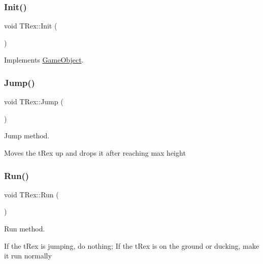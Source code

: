 \mbox{\label{class_t_rex_a9975357a104130b3b8f6c5ed65f2eb0e}} 
\subsubsection{\texorpdfstring{Init()}{Init()}}
{\footnotesize\ttfamily void T\+Rex\+::\+Init (\begin{DoxyParamCaption}{ }\end{DoxyParamCaption})\hspace{0.3cm}{\ttfamily [virtual]}}



Implements \mbox{\hyperlink{class_game_object_ab3b70fcc4e640ba2081508b1efb35536}{Game\+Object}}.

\mbox{\label{class_t_rex_abc238b8e1df77d79f259cadd3a6c4cc8}} 
\subsubsection{\texorpdfstring{Jump()}{Jump()}}
{\footnotesize\ttfamily void T\+Rex\+::\+Jump (\begin{DoxyParamCaption}{ }\end{DoxyParamCaption})}



Jump method. 

Moves the t\+Rex up and drops it after reaching max height \mbox{\label{class_t_rex_af0e9ccbecc23739201a85e489da81efd}} 
\subsubsection{\texorpdfstring{Run()}{Run()}}
{\footnotesize\ttfamily void T\+Rex\+::\+Run (\begin{DoxyParamCaption}{ }\end{DoxyParamCaption})}



Run method. 

If the t\+Rex is jumping, do nothing; If the t\+Rex is on the ground or ducking, make it run normally \mbox{\label{class_t_rex_aaef538213b79fb870e8af8f0cdf39a14}} 
